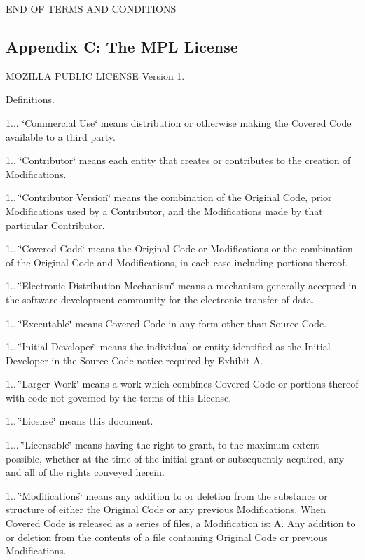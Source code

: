 E\-N\-D O\-F T\-E\-R\-M\-S A\-N\-D C\-O\-N\-D\-I\-T\-I\-O\-N\-S

\subsection*{Appendix C\-: The M\-P\-L License }

M\-O\-Z\-I\-L\-L\-A P\-U\-B\-L\-I\-C L\-I\-C\-E\-N\-S\-E Version 1.
\begin{DoxyEnumerate}
\item Definitions.

1... \char`\"{}\-Commercial Use\char`\"{} means distribution or otherwise making the Covered Code available to a third party.

1.. \char`\"{}\-Contributor\char`\"{} means each entity that creates or contributes to the creation of Modifications.

1.. \char`\"{}\-Contributor Version\char`\"{} means the combination of the Original Code, prior Modifications used by a Contributor, and the Modifications made by that particular Contributor.

1.. \char`\"{}\-Covered Code\char`\"{} means the Original Code or Modifications or the combination of the Original Code and Modifications, in each case including portions thereof.

1.. \char`\"{}\-Electronic Distribution Mechanism\char`\"{} means a mechanism generally accepted in the software development community for the electronic transfer of data.

1.. \char`\"{}\-Executable\char`\"{} means Covered Code in any form other than Source Code.

1.. \char`\"{}\-Initial Developer\char`\"{} means the individual or entity identified as the Initial Developer in the Source Code notice required by Exhibit A.

1.. \char`\"{}\-Larger Work\char`\"{} means a work which combines Covered Code or portions thereof with code not governed by the terms of this License.

1.. \char`\"{}\-License\char`\"{} means this document.

1... \char`\"{}\-Licensable\char`\"{} means having the right to grant, to the maximum extent possible, whether at the time of the initial grant or subsequently acquired, any and all of the rights conveyed herein.

1.. \char`\"{}\-Modifications\char`\"{} means any addition to or deletion from the substance or structure of either the Original Code or any previous Modifications. When Covered Code is released as a series of files, a Modification is\-: A. Any addition to or deletion from the contents of a file containing Original Code or previous Modifications.


\end{DoxyEnumerate}
